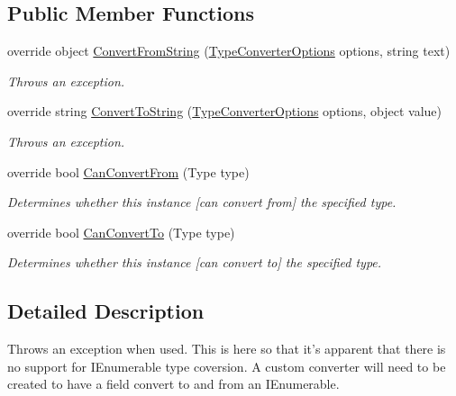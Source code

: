 \subsection*{Public Member Functions}
\begin{DoxyCompactItemize}
\item 
override object \hyperlink{a00076_a692617638507cd1033728d7f718fcd2a}{Convert\-From\-String} (\hyperlink{a00152}{Type\-Converter\-Options} options, string text)
\begin{DoxyCompactList}\small\item\em Throws an exception. \end{DoxyCompactList}\item 
override string \hyperlink{a00076_a7e07e9532857d748654d37db590a0e11}{Convert\-To\-String} (\hyperlink{a00152}{Type\-Converter\-Options} options, object value)
\begin{DoxyCompactList}\small\item\em Throws an exception. \end{DoxyCompactList}\item 
override bool \hyperlink{a00076_af66a7c67041f4c8061aa66e9e36359cf}{Can\-Convert\-From} (Type type)
\begin{DoxyCompactList}\small\item\em Determines whether this instance \mbox{[}can convert from\mbox{]} the specified type. \end{DoxyCompactList}\item 
override bool \hyperlink{a00076_a44d625b44f770b945a29cd89e399f90f}{Can\-Convert\-To} (Type type)
\begin{DoxyCompactList}\small\item\em Determines whether this instance \mbox{[}can convert to\mbox{]} the specified type. \end{DoxyCompactList}\end{DoxyCompactItemize}


\subsection{Detailed Description}
Throws an exception when used. This is here so that it's apparent that there is no support for I\-Enumerable type coversion. A custom converter will need to be created to have a field convert to and from an I\-Enumerable. 



